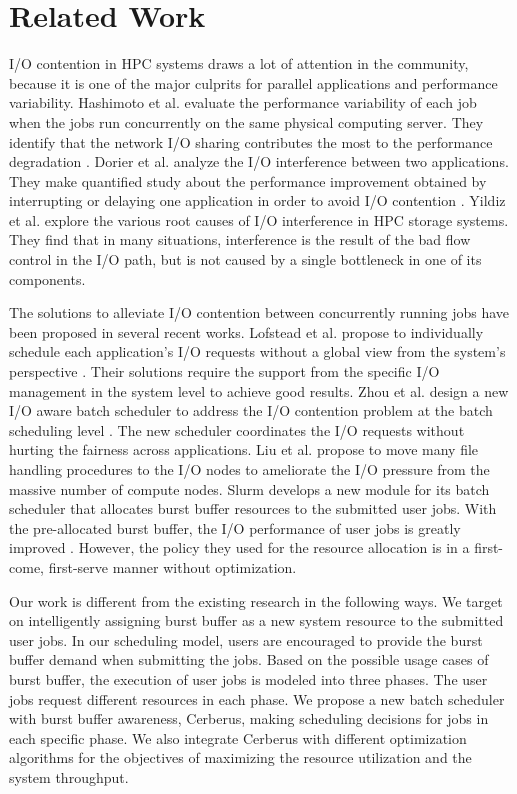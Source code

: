 \section{Related Work}
\label{Sec:RelatedWorks}

I/O contention in HPC systems draws a lot of attention in the community,
because it is one of the major culprits for parallel applications and performance variability.
Hashimoto et al. evaluate the performance variability of each job
when the jobs run concurrently on the same physical computing server.
They identify that the network I/O sharing contributes the most to
the performance degradation \cite{hashimoto:ICNC:2012}.
Dorier et al. analyze the I/O interference between two applications.
They make quantified study about the performance improvement obtained
by interrupting or delaying one application in order to avoid I/O contention \cite{dorier:IPDPS:2014}.
Yildiz et al. \cite{yildiz:IPDPS:2016} explore the various root causes
of I/O interference in HPC storage systems.
They find that in many situations, interference is the result of the bad flow control in the I/O path,
but is not caused by a single bottleneck in one of its components.

The solutions to alleviate I/O contention between concurrently
running jobs have been proposed in several recent works.
Lofstead et al. propose to individually schedule each application's I/O requests without
a global view from the system's perspective \cite{lofstead:sc:2010}.
Their solutions require the support from the specific I/O management
in the system level to achieve good results.
Zhou et al. design a new I/O aware batch scheduler to address the I/O
contention problem at the batch scheduling level \cite{zhou:Cluster:2015}.
The new scheduler coordinates the  I/O requests without hurting the fairness across applications.
Liu et al. propose to move many file handling procedures to the I/O nodes to
ameliorate the I/O pressure from the massive number of compute nodes\cite{Liu:MSST:2012}.
Slurm develops a new module for its batch scheduler that allocates burst buffer
resources to the submitted user jobs. With the pre-allocated burst buffer,
the I/O performance of user jobs is greatly improved \cite{SlurmBBGuide}.
However, the policy they used for the resource allocation is in a first-come, first-serve manner without optimization.

Our work is different from the existing research in the following ways.
We target on intelligently assigning burst buffer as a new system resource to the submitted user jobs.
In our scheduling model, users are encouraged to provide the burst buffer demand when submitting the jobs.
Based on the possible usage cases of burst buffer, the execution of user jobs is modeled into three phases.
The user jobs request different resources in each phase.
We propose a new batch scheduler with burst buffer awareness, Cerberus,
making scheduling decisions for jobs in each specific phase.
We also integrate Cerberus with different optimization algorithms for the
objectives of maximizing the resource utilization and the system throughput.




